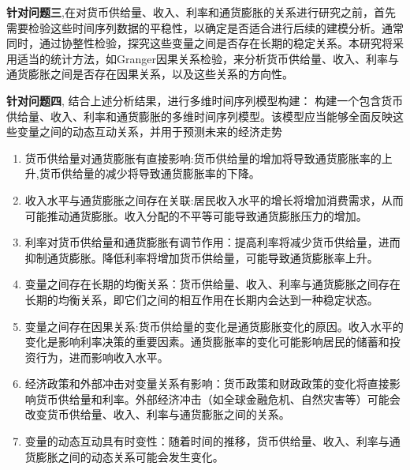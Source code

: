 \textbf {针对问题三},在对货币供给量、收入、利率和通货膨胀的关系进行研究之前，首先需要检验这些时间序列数据的平稳性，以确定是否适合进行后续的建模分析。通常同时，通过协整性检验，探究这些变量之间是否存在长期的稳定关系。本研究将采用适当的统计方法，如Granger因果关系检验，来分析货币供给量、收入、利率与通货膨胀之间是否存在因果关系，以及这些关系的方向性。

\textbf {针对问题四},
结合上述分析结果，进行多维时间序列模型构建： 构建一个包含货币供给量、收入、利率和通货膨胀的多维时间序列模型。该模型应当能够全面反映这些变量之间的动态互动关系，并用于预测未来的经济走势









\begin{enumerate}
    \item 货币供给量对通货膨胀有直接影响:货币供给量的增加将导致通货膨胀率的上升,货币供给量的减少将导致通货膨胀率的下降。
    \item 收入水平与通货膨胀之间存在关联:居民收入水平的增长将增加消费需求，从而可能推动通货膨胀。收入分配的不平等可能导致通货膨胀压力的增加。
    
    \item 利率对货币供给量和通货膨胀有调节作用：提高利率将减少货币供给量，进而抑制通货膨胀。降低利率将增加货币供给量，可能导致通货膨胀率上升。
    
    \item 变量之间存在长期的均衡关系：货币供给量、收入、利率与通货膨胀之间存在长期的均衡关系，即它们之间的相互作用在长期内会达到一种稳定状态。
    \item 变量之间存在因果关系:货币供给量的变化是通货膨胀变化的原因。收入水平的变化是影响利率决策的重要因素。通货膨胀率的变化可能影响居民的储蓄和投资行为，进而影响收入水平。
    
    \item 经济政策和外部冲击对变量关系有影响：货币政策和财政政策的变化将直接影响货币供给量和利率。外部经济冲击（如全球金融危机、自然灾害等）可能会改变货币供给量、收入、利率与通货膨胀之间的关系。
    \item 变量的动态互动具有时变性：随着时间的推移，货币供给量、收入、利率与通货膨胀之间的动态关系可能会发生变化。
    
 
    
\end{enumerate}

